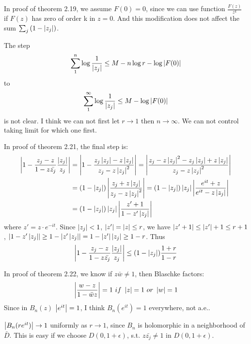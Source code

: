 \begin{remark}
    In proof of theorem 2.19, we assume $F(0)=0$, since we can use function $\frac{F(z)}{z^k}$ if $F(z)$ has zero of order k in $z=0$.
    And this modification does not affect the sum $\sum_j{(1-\left\lvert z_j\right\rvert)}$.\par
    {\color{blue} The step
        \begin{equation*}
            \sum_1^n{\log{\frac{1}{\left\lvert z_j\right\rvert}}}\leq M-n\log{r}-\log{\left\lvert F(0)\right\rvert}
        \end{equation*}
        to
        \begin{equation*}
            \sum_1^\infty{\log{\frac{1}{\left\lvert z_j\right\rvert}}}\leq M-\log{\left\lvert F(0)\right\rvert}
        \end{equation*}
        is not clear. I think we can not first let $r\to 1$ then $n\to \infty$. We can not control taking limit for which one first.
    }\par
    In proof of theorem 2.21, the final step is:
    \begin{align*}
        \left\lvert1-\frac{z_j-z}{1-z\bar{z_j}}\frac{\left\lvert z_j\right\rvert}{z_j}\right\rvert & =\left\lvert1-\frac{z_j\left\lvert z_j\right\rvert-z\left\lvert z_j\right\rvert}{z_j-z\left\lvert z_j\right\rvert^2}\right\rvert
        =\left\lvert\frac{z_j-z\left\lvert z_j\right\rvert^2-z_j\left\lvert z_j\right\rvert+z\left\lvert z_j\right\rvert}{z_j-z\left\lvert z_j\right\rvert^2}\right\rvert                                                                                                             \\
                                                                & =(1-\left\lvert z_j\right\rvert)\left\lvert\frac{z_j+z\left\lvert z_j\right\rvert}{z_j-z\left\lvert z_j\right\rvert^2}\right\rvert=(1-\left\lvert z_j\right\rvert)\left\lvert z_j\right\rvert\left\lvert\frac{e^{it}+z}{e^{it}-z\left\lvert z_j\right\rvert}\right\rvert \\
                                                                & =(1-\left\lvert z_j\right\rvert)\left\lvert z_j\right\rvert\left\lvert\frac{z'+1}{1-z'\left\lvert z_j\right\rvert}\right\rvert
    \end{align*}
    where $z'=z\cdot e^{-it}$. Since $\left\lvert z_j\right\rvert<1$, $\left\lvert z'\right\rvert=\left\lvert z\right\rvert\leq r$, we have $\left\lvert z'+1\right\rvert\leq\left\lvert z'\right\rvert+1\leq r+1$, $\left\lvert1-z'\left\lvert z_j\right\rvert\right\rvert\geq 1-\left\lvert z'\left\lvert z_j\right\rvert\right\rvert=1-\left\lvert z'\right\rvert\left\lvert z_j\right\rvert\geq 1-r$. Thus
    \begin{equation*}
        \left\lvert1-\frac{z_j-z}{1-z\bar{z_j}}\frac{\left\lvert z_j\right\rvert}{z_j}\right\rvert\leq(1-\left\lvert z_j\right\rvert)\frac{1+r}{1-r}
    \end{equation*}\par
    In proof of theorem 2.22, we know if $z\bar{w}\neq 1$, then Blaschke factors:
    \begin{equation*}
        \left\lvert\frac{w-z}{1-\bar{w}z}\right\rvert=1~if~\left\lvert z\right\rvert=1~or~\left\lvert w\right\rvert=1
    \end{equation*}
    {\color{blue}Since in $B_n(z)$ $\left\lvert e^{it}\right\rvert=1$, I think $B_n(e^{it})=1$ everywhere, not a.e.}.\par
    $\left\lvert B_n(re^{it})\right\rvert\to 1$ uniformly as $r\to 1$, since $B_n$ is holomorphic in a neighborhood of $\bar{D}$. This is easy
    if we choose $D(0,1+\epsilon)$, s.t. $z\bar{z_j}\neq 1$ in $D(0,1+\epsilon)$.
\end{remark}
% 
